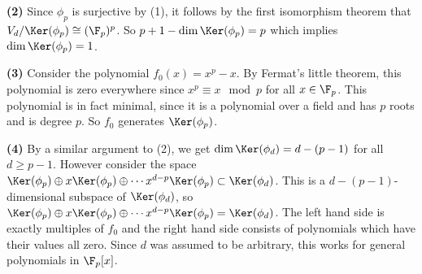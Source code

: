 \textbf{(2)} Since $\phi_p$ is surjective by (1), it follows by the first isomorphism theorem that $V_d /\Ker(\phi_p) \cong (\F_p)^p$. So $p+1 - \dim \Ker(\phi_p) = p$ which implies $\dim \Ker(\phi_p) = 1$.     

\textbf{(3)} Consider the polynomial $f_0(x)=x^p-x$. By Fermat's little theorem, this polynomial is zero everywhere since $x^p\equiv x\mod p$ for all $x\in \F_p$. This polynomial is in fact minimal, since it is a polynomial over a field and has $p$ roots and is degree $p$. So $f_0$ generates $\Ker(\phi_p)$.

\textbf{(4)} By a similar argument to (2), we get $\dim \Ker(\phi_d) = d - (p-1)$ for all $d\geq p-1$. However consider the space $\Ker(\phi_p)\oplus x\Ker(\phi_p)\oplus\cdots x^{d-p}\Ker(\phi_p)\subset \Ker(\phi_d)$. This is a $d-(p-1)$-dimensional subspace of $\Ker(\phi_d)$, so $\Ker(\phi_p)\oplus x\Ker(\phi_p)\oplus\cdots x^{d-p}\Ker(\phi_p)= \Ker(\phi_d)$. The left hand side is exactly multiples of $f_0$ and the right hand side consists of polynomials which have their values all zero. Since $d$ was assumed to be arbitrary, this works for general polynomials in $\F_p[x]$.  